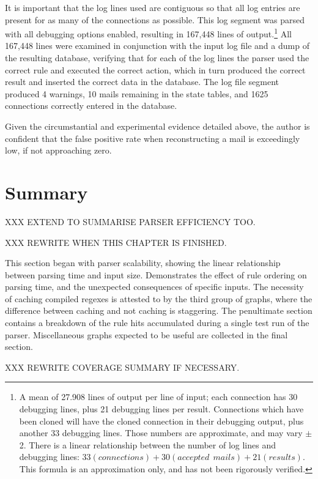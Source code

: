It is important that the log lines used are contiguous so that all log
entries are present for as many of the connections as possible.  This log
segment was parsed with all debugging options enabled, resulting in 167,448
lines of output.\footnote{A mean of 27.908 lines of output per line of
input; each connection has 30 debugging lines, plus 21 debugging lines per
result.  Connections which have been cloned will have the cloned connection
in their debugging output, plus another 33 debugging lines.  Those numbers
are approximate, and may vary $\pm{}$ 2.  There is a linear relationship
between the number of log lines and debugging lines: $33(connections) +
30(accepted~~mails) + 21(results)$.  This formula is an approximation only,
and has not been rigorously verified.}  All 167,448 lines were examined in
conjunction with the input log file and a dump of the resulting database,
verifying that for each of the log lines the parser used the correct rule
and executed the correct action, which in turn produced the correct result
and inserted the correct data in the database.  The log file segment
produced 4 warnings, 10 mails remaining in the state tables, and 1625
connections correctly entered in the database.

Given the circumstantial and experimental evidence detailed above, the
author is confident that the false positive rate when reconstructing a mail
is exceedingly low, if not approaching zero.

\section{Summary}

XXX EXTEND TO SUMMARISE PARSER EFFICIENCY TOO\@.

XXX REWRITE WHEN THIS CHAPTER IS FINISHED\@.

This section began with parser scalability, showing the linear relationship
between parsing time and input size.  Demonstrates the effect of rule
ordering on parsing time, and the unexpected consequences of specific
inputs.  The necessity of caching compiled regexes is attested to by the
third group of graphs, where the difference between caching and not caching
is staggering.  The penultimate section contains a breakdown of the rule
hits accumulated during a single test run of the parser.  Miscellaneous
graphs expected to be useful are collected in the final section.

XXX REWRITE COVERAGE SUMMARY IF NECESSARY\@.

